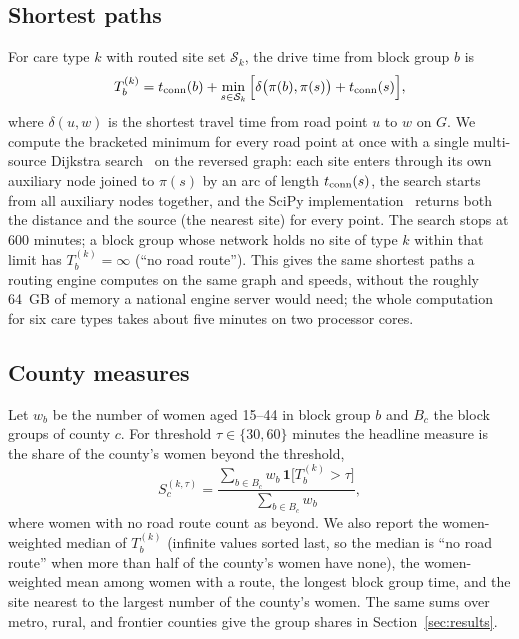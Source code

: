 \documentclass[10pt,twocolumn,letterpaper]{article}
\begin{document}
\subsection{Shortest paths}
For care type $k$ with routed site set $\mathcal{S}_k$, the drive time from block group $b$ is
\begin{equation}
T_b^{(k)}=t_{\rm conn}(b)+\min_{s\in\mathcal{S}_k}\Big[\delta\big(\pi(b),\pi(s)\big)+t_{\rm conn}(s)\Big],\label{eq:T}
\end{equation}
where $\delta(u,w)$ is the shortest travel time from road point $u$ to $w$ on $G$. We compute the bracketed minimum for every road point at once with a single multi-source Dijkstra search~\cite{dijkstra1959} on the reversed graph: each site enters through its own auxiliary node joined to $\pi(s)$ by an arc of length $t_{\rm conn}(s)$, the search starts from all auxiliary nodes together, and the SciPy implementation~\cite{scipy2020} returns both the distance and the source (the nearest site) for every point. The search stops at 600 minutes; a block group whose network holds no site of type $k$ within that limit has $T_b^{(k)}=\infty$ (``no road route''). This gives the same shortest paths a routing engine computes on the same graph and speeds, without the roughly 64~GB of memory a national engine server would need; the whole computation for six care types takes about five minutes on two processor cores.

\subsection{County measures}
Let $w_b$ be the number of women aged 15--44 in block group $b$ and $B_c$ the block groups of county $c$. For threshold $\tau\in\{30,60\}$ minutes the headline measure is the share of the county's women beyond the threshold,
\begin{equation}
S_c^{(k,\tau)}=\frac{\sum_{b\in B_c}w_b\,\mathbf{1}\big[T_b^{(k)}>\tau\big]}{\sum_{b\in B_c}w_b},\label{eq:share}
\end{equation}
where women with no road route count as beyond. We also report the women-weighted median of $T_b^{(k)}$ (infinite values sorted last, so the median is ``no road route'' when more than half of the county's women have none), the women-weighted mean among women with a route, the longest block group time, and the site nearest to the largest number of the county's women. The same sums over metro, rural, and frontier counties give the group shares in Section~\ref{sec:results}.
\end{document}
